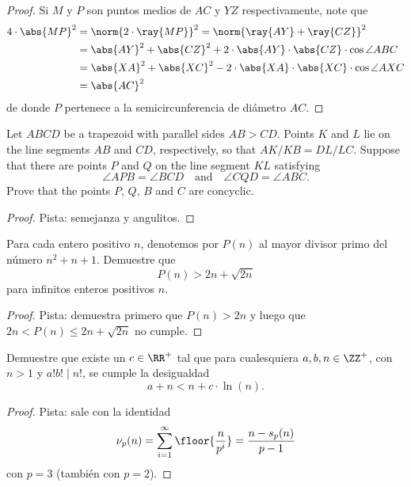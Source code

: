 \begin{proof}
	Si $M$ y $P$ son puntos medios de $AC$ y $YZ$ respectivamente, note que
	\begin{align*}
		4\cdot\abs{MP}^2
		&=\norm{2\cdot\ray{MP}}^2=\norm{\ray{AY}+\ray{CZ}}^2\\
		&=\abs{AY}^2+\abs{CZ}^2+2\cdot\abs{AY}\cdot\abs{CZ}\cdot\cos{\angle ABC}\\
		&=\abs{XA}^2+\abs{XC}^2-2\cdot\abs{XA}\cdot\abs{XC}\cdot\cos{\angle AXC}\\
		&=\abs{AC}^2
	\end{align*}
	de donde $P$ pertenece a la semicircunferencia de diámetro $AC$.
\end{proof}


\begin{probEG}
	Let $ABCD$ be a trapezoid with parallel sides $AB>CD$. Points $K$ and $L$ lie on the line segments $AB$ and $CD$, respectively, so that $AK/KB=DL/LC$. Suppose that there are points $P$ and $Q$ on the line segment $KL$ satisfying
	\[\angle APB=\angle BCD\quad\text{and}\quad\angle CQD=\angle ABC.\]
	Prove that the points $P$, $Q$, $B$ and $C$ are concyclic.
\end{probEG}

\begin{proof}
	Pista: semejanza y angulitos.
\end{proof}


\begin{probEG}
	Para cada entero positivo $n$, denotemos por $P(n)$ al mayor divisor primo del número $n^2+n+1$. Demuestre que
	\[P(n)>2n+\sqrt{2n}\]
	para infinitos enteros positivos $n$.
\end{probEG}

\begin{proof}
	Pista: demuestra primero que $P(n)>2n$ y luego que $2n<P(n)\le 2n+\sqrt{2n}$ no cumple.
\end{proof}

\begin{probEG}
	Demuestre que existe un $c\in\RR^+$ tal que para cualesquiera $a,b,n\in\ZZ^+$, con $n>1$ y $a!b!\mid n!$, se cumple la desigualdad
	\[a+n<n+c\cdot\ln(n).\]
\end{probEG}

\begin{proof}
	Pista: sale con la identidad
	\[\nu_p(n)=\sum_{i=1}^\infty\floor{\frac{n}{p^i}}=\frac{n-s_p(n)}{p-1}\]
	con $p=3$ (también con $p=2$).
\end{proof}

